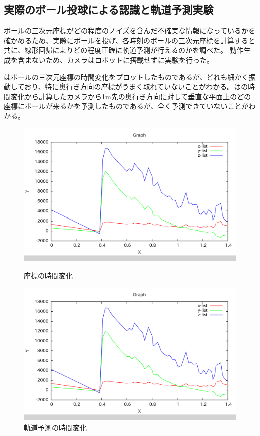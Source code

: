 \documentclass[twocolumn]{preport}
\begin{document}
\subsection{実際のボール投球による認識と軌道予測実験}
ボールの三次元座標がどの程度のノイズを含んだ不確実な情報になっているかを確かめるため、実際にボールを投げ、各時刻のボールの三次元座標を計算すると共に、線形回帰によりどの程度正確に軌道予測が行えるのかを調べた。
動作生成を含まないため、カメラはロボットに搭載せずに実験を行った。

はボールの三次元座標の時間変化をプロットしたものであるが、どれも細かく振動しており、特に奥行き方向の座標がうまく取れていないことがわかる。はの時間変化から計算したカメラから1m先の奥行き方向に対して垂直な平面上のどの座標にボールが来るかを予測したものであるが、全く予測できていないことがわかる。

\begin{figure}[tbh]
 \begin{center}
  \begin{minipage}{0.45\columnwidth}
   \includegraphics[width=\columnwidth]{coordinates_graph_316.png}
   \caption{座標の時間変化}
   \label{figure:coords_graph}
  \end{minipage}
  \hspace{0.05\columnwidth}
  \begin{minipage}{0.45\columnwidth}
   \includegraphics[width=\columnwidth]{coordinates_graph_316.png}
   \caption{軌道予測の時間変化}
   \label{figure:est_graph}
  \end{minipage}
 \end{center}
\end{figure}
\end{document}

